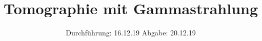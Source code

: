 

\subject{V14}
\title{Tomographie mit Gamma­strahlung}
\date{
  Durchführung: 16.12.19
  \hspace{3em}
  Abgabe: 20.12.19
}



\maketitle
\thispagestyle{empty}
\tableofcontents
\newpage




%



\newpage
\printbibliography


